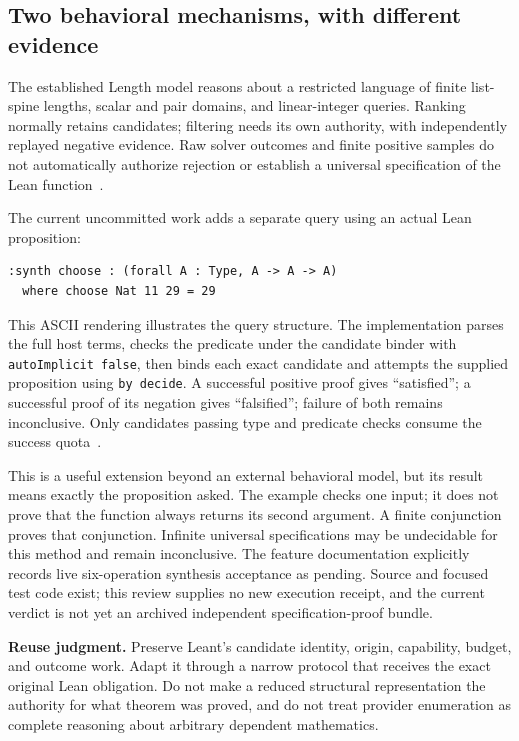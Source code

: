 \documentclass[11pt,letterpaper]{article}
\newcommand{\code}[1]{\nolinkurl{#1}}
\begin{document}
\subsection{Two behavioral mechanisms, with different evidence}
The established Length model reasons about a restricted language of finite
list-spine lengths, scalar and pair domains, and linear-integer queries. Ranking
normally retains candidates; filtering needs its own authority, with independently
replayed negative evidence. Raw solver outcomes and finite positive samples do
not automatically authorize rejection or establish a universal specification of
the Lean function~\cite{l-length}.

The current uncommitted work adds a separate query using an actual Lean proposition:
\begin{lstlisting}
:synth choose : (forall A : Type, A -> A -> A)
  where choose Nat 11 29 = 29
\end{lstlisting}
This ASCII rendering illustrates the query structure. The implementation parses
the full host terms, checks the predicate under the candidate binder with
\code{autoImplicit false}, then binds each exact candidate and attempts the
supplied proposition using \code{by decide}. A successful positive proof gives
``satisfied''; a successful proof of its negation gives ``falsified''; failure
of both remains inconclusive. Only candidates passing type and predicate checks
consume the success quota~\cite{l-behavior}.

This is a useful extension beyond an external behavioral model, but its result
means exactly the proposition asked. The example checks one input; it does not
prove that the function always returns its second argument. A finite conjunction
proves that conjunction. Infinite universal specifications may be undecidable
for this method and remain inconclusive. The feature documentation explicitly
records live six-operation synthesis acceptance as pending. Source and focused
test code exist; this review supplies no new execution receipt, and the current
verdict is not yet an archived independent specification-proof bundle.

\textbf{Reuse judgment.} Preserve Leant's candidate identity, origin, capability,
budget, and outcome work. Adapt it through a narrow protocol that receives the
exact original Lean obligation. Do not make a reduced structural representation
the authority for what theorem was proved, and do not treat provider enumeration
as complete reasoning about arbitrary dependent mathematics.
\end{document}
